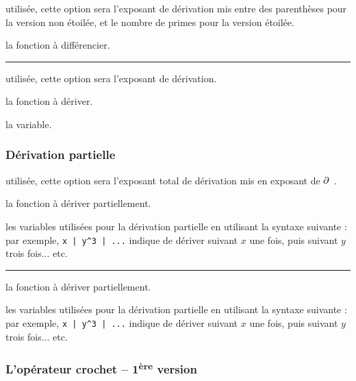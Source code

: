 \documentclass[12pt,a4paper]{article}
\theoremstyle{definition}
\newcommand\separation{
	\medskip
	\hfill\rule{0.5\textwidth}{0.75pt}\hfill
	\medskip
}
\begin{document}
\IDoption{} utilisée, cette option sera l'exposant de dérivation mis entre des parenthèses pour la version non étoilée, et le nombre de primes pour la version étoilée.

\IDarg{} la fonction à différencier.


\separation





\IDoption{} utilisée, cette option sera l'exposant de dérivation.

 la fonction à dériver.

 la variable.





\subsubsection{Dérivation partielle}




\IDoption{} utilisée, cette option sera l'exposant total de dérivation mis en exposant de $\pp$.

 la fonction à dériver partiellement.

 les variables utilisées pour la dérivation partielle en utilisant la syntaxe suivante : par exemple, \verb+x | y^3 | ...+ indique de dériver suivant $x$ une fois, puis suivant $y$ trois fois... etc.


\separation




 la fonction à dériver partiellement.

 les variables utilisées pour la dérivation partielle en utilisant la syntaxe suivante : par exemple, \verb+x | y^3 | ...+ indique de dériver suivant $x$ une fois, puis suivant $y$ trois fois... etc.
\subsubsection{L'opérateur crochet -- 1\textsuperscript{ère} version}


\end{document}
